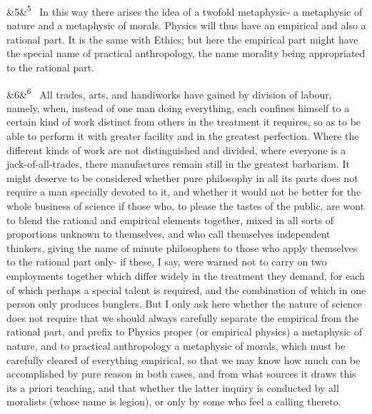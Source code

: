 \documentclass[12pt]{article}
\newcommand{\para}[1][]{\par\noindent\ifx&#1&\else\textsuperscript{\footnotesize #1}~\fi}
\begin{document}
\para[5] In this way there arises the idea of a twofold metaphysic- a metaphysic of nature and a metaphysic of morals. Physics will thus have an empirical and also a rational part. It is the same with Ethics; but here the empirical part might have the special name of practical anthropology, the name morality being appropriated to the rational part.

\para[6] All trades, arts, and handiworks have gained by division of labour, namely, when, instead of one man doing everything, each confines himself to a certain kind of work distinct from others in the treatment it requires, so as to be able to perform it with greater facility and in the greatest perfection. Where the different kinds of work are not distinguished and divided, where everyone is a jack-of-all-trades, there manufactures remain still in the greatest barbarism. It might deserve to be considered whether pure philosophy in all its parts does not require a man specially devoted to it, and whether it would not be better for the whole business of science if those who, to please the tastes of the public, are wont to blend the rational and empirical elements together, mixed in all sorts of proportions unknown to themselves, and who call themselves independent thinkers, giving the name of minute philosophers to those who apply themselves to the rational part only- if these, I say, were warned not to carry on two employments together which differ widely in the treatment they demand, for each of which perhaps a special talent is required, and the combination of which in one person only produces bunglers. But I only ask here whether the nature of science does not require that we should always carefully separate the empirical from the rational part, and prefix to Physics proper (or empirical physics) a metaphysic of nature, and to practical anthropology a metaphysic of morals, which must be carefully cleared of everything empirical, so that we may know how much can be accomplished by pure reason in both cases, and from what sources it draws this its a priori teaching, and that whether the latter inquiry is conducted by all moralists (whose name is legion), or only by some who feel a calling thereto.
\end{document}
